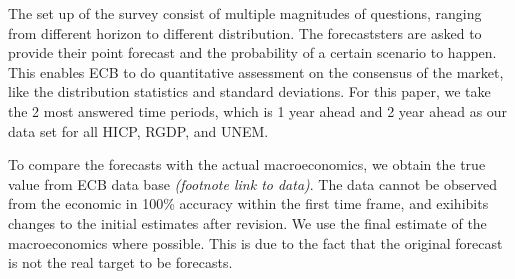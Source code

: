 \documentclass[]{article}
\begin{document}
The set up of the survey consist of multiple magnitudes of questions,
ranging from different horizon to different distribution. The
forecaststers are asked to provide their point forecast and the
probability of a certain scenario to happen. This enables ECB to do
quantitative assessment on the consensus of the market, like the
distribution statistics and standard deviations. For this paper, we take
the 2 most answered time periods, which is 1 year ahead and 2 year ahead
as our data set for all HICP, RGDP, and UNEM.

To compare the forecasts with the actual macroeconomics, we obtain the
true value from ECB data base \emph{(footnote link to data)}. The data
cannot be observed from the economic in 100\% accuracy within the first
time frame, and exihibits changes to the initial estimates after
revision. We use the final estimate of the macroeconomics where
possible. This is due to the fact that the original forecast is not the
real target to be forecasts.
\end{document}
